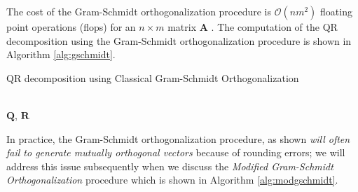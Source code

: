 \documentclass{article}[11pt]
\newcommand{\norm}[1]{\left|\left|#1\right|\right|}
\begin{document}
The cost of the Gram-Schmidt orthogonalization procedure is $\mathcal{O}(nm^{2})$ floating point operations (flops) for an $n\times{m}$ matrix $\mathbf{A}$ \cite{golub13}.
The computation of the QR decomposition using the Gram-Schmidt orthogonalization procedure is shown in Algorithm \ref{alg:gschmidt}.
\begin{algorithm}[H]
   \begin{algorithmic}[1]
   \caption{QR decomposition using Classical Gram-Schmidt Orthogonalization}\label{alg:gschmidt}
      \EndFor
      \State{$\mathbf{Q}_{j}\gets\mathbf{v}_{j}/\norm{\mathbf{v}_{j}}_{2}$}
   \EndFor
   \\
   \Return $\mathbf{Q}$, $\mathbf{R}$
   \end{algorithmic}
\end{algorithm}
In practice, the Gram-Schmidt orthogonalization procedure, as shown \emph{will often fail to generate mutually orthogonal vectors} because of rounding errors; we will address
this issue subsequently when we discuss the \emph{Modified Gram-Schmidt Orthogonalization} 
procedure which is shown in Algorithm \ref{alg:modgschmidt}.
\end{document}
